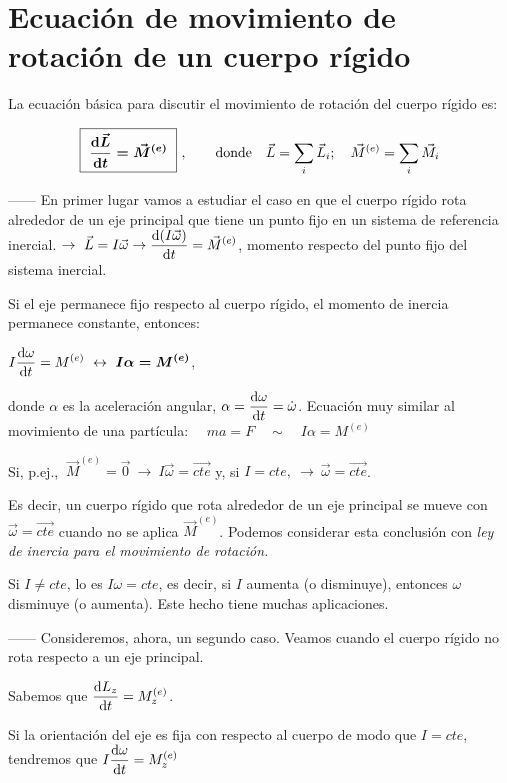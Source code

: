 \section[Ecuación de movimiento de rotación de un cuerpo rígido]{Ecuación de movimiento de rotación de un cuerpo rígido}
La ecuación básica para discutir el movimiento de rotación del cuerpo rígido es:

$$\displaystyle \boxed{\ \boldsymbol{ \dv{\vec L}{t}=\vec M^{(e)} }\ } \ , \qquad \text{donde}\quad \vec L=\sum_i \vec L_i; \quad \vec M^{(e)}=\sum_i \vec M_i$$ 

------ En primer lugar vamos a estudiar el caso en que el cuerpo rígido rota alrededor de un eje principal que tiene un punto fijo en un sistema de referencia inercial.
$\to \ \displaystyle \vec L=I\vec \omega \to 	\dv{(I\vec \omega)}{t}=\vec M^{(e)}$, 
momento respecto del punto fijo del sistema inercial.

Si el eje permanece fijo respecto al cuerpo rígido, el momento de inercia permanece constante, entonces:

$\displaystyle I\dv{\omega}{t}=M^{(e)} \ \leftrightarrow \ \boldsymbol{ I\alpha=M^{(e)}}$,

donde $\alpha$ es la aceleración angular, $\alpha=\displaystyle \dv{\omega}{t}=\dot{\omega}$. 
Ecuación muy similar al movimiento de una partícula: $ \quad ma=F \quad \sim \quad  I\alpha=M^{(e)}$

Si, p.ej., $\ \vec M^{(e)}=\vec 0 \ \to \ I\vec \omega=\overrightarrow{cte}$ y, si $I=cte ,\ \to \ \vec \omega =\overrightarrow {cte}$.

Es decir, un cuerpo rígido que rota alrededor de un eje principal se mueve con $\vec \omega=\overrightarrow{cte}$
cuando no se aplica $\vec M^{(e)}$. Podemos considerar esta conclusión con \emph{ley de inercia para el movimiento de rotación.}

Si $I\neq cte$, lo es $I \omega=cte$, es decir, si $I$ aumenta (o disminuye), entonces $\omega$ disminuye (o aumenta). Este hecho tiene muchas aplicaciones.

------ Consideremos, ahora, un segundo caso. Veamos cuando el cuerpo rígido no rota respecto a un eje principal.

Sabemos que $\displaystyle \dv{L_z}{t}=M_z^{(e)}$.

Si la orientación del eje es fija con respecto al cuerpo de modo que $I=cte$, tendremos que $\displaystyle I \dv{\omega}{t}= M_z^{(e)} $

